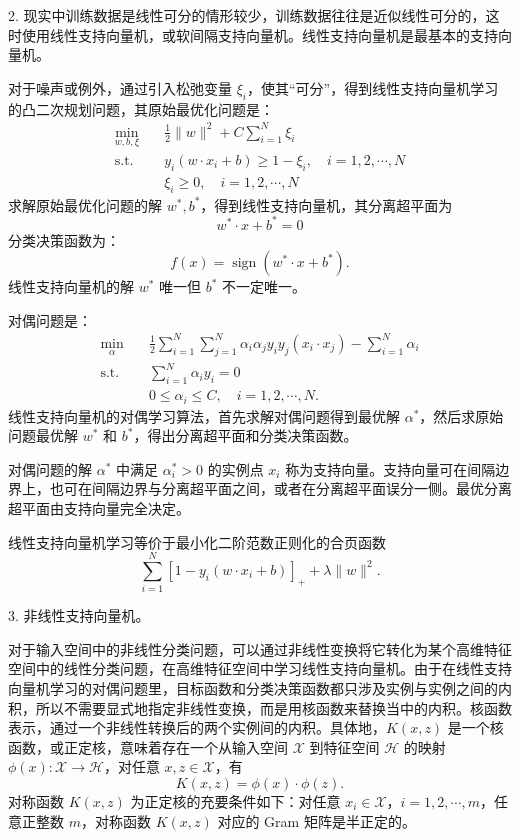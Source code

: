 \documentclass[UTF8, 12pt, fontset=fandol, oneside]{ctexart}
\begin{document}
2. 现实中训练数据是线性可分的情形较少，训练数据往往是近似线性可分的，这时使用线性支持向量机，或软间隔支持向量机。线性支持向量机是最基本的支持向量机。

对于噪声或例外，通过引入松弛变量 $\xi_i$，使其“可分”，得到线性支持向量机学习的凸二次规划问题，其原始最优化问题是：
\[
\begin{aligned}
\min_{w,b,\xi}\quad & \frac{1}{2}\|w\|^2+C\sum_{i=1}^N\xi_i\\
\mathrm{s.t.}\quad & y_i(w\cdot x_i+b)\geq 1-\xi_i,\quad i=1,2,\cdots,N\\
& \xi_i\geq 0,\quad i=1,2,\cdots,N
\end{aligned}
\]
求解原始最优化问题的解 $w^*,b^*$，得到线性支持向量机，其分离超平面为
\[
w^*\cdot x+b^*=0
\]
分类决策函数为：
\[
f(x)=\operatorname{sign}(w^*\cdot x+b^*).
\]
线性支持向量机的解 $w^*$ 唯一但 $b^*$ 不一定唯一。

对偶问题是：
\[
\begin{aligned}
\min_\alpha\quad & \frac{1}{2}\sum_{i=1}^N\sum_{j=1}^N\alpha_i\alpha_j y_i y_j(x_i\cdot x_j)-\sum_{i=1}^N\alpha_i\\
\mathrm{s.t.}\quad & \sum_{i=1}^N\alpha_i y_i=0\\
& 0\leq \alpha_i\leq C,\quad i=1,2,\cdots,N.
\end{aligned}
\]
线性支持向量机的对偶学习算法，首先求解对偶问题得到最优解 $\alpha^*$，然后求原始问题最优解 $w^*$ 和 $b^*$，得出分离超平面和分类决策函数。

对偶问题的解 $\alpha^*$ 中满足 $\alpha_i^*>0$ 的实例点 $x_i$ 称为支持向量。支持向量可在间隔边界上，也可在间隔边界与分离超平面之间，或者在分离超平面误分一侧。最优分离超平面由支持向量完全决定。

线性支持向量机学习等价于最小化二阶范数正则化的合页函数
\[
\sum_{i=1}^N[1-y_i(w\cdot x_i+b)]_++\lambda\|w\|^2.
\]

3. 非线性支持向量机。

对于输入空间中的非线性分类问题，可以通过非线性变换将它转化为某个高维特征空间中的线性分类问题，在高维特征空间中学习线性支持向量机。由于在线性支持向量机学习的对偶问题里，目标函数和分类决策函数都只涉及实例与实例之间的内积，所以不需要显式地指定非线性变换，而是用核函数来替换当中的内积。核函数表示，通过一个非线性转换后的两个实例间的内积。具体地，$K(x,z)$ 是一个核函数，或正定核，意味着存在一个从输入空间 $\mathcal{X}$ 到特征空间 $\mathcal{H}$ 的映射 $\phi(x):\mathcal{X}\to\mathcal{H}$，对任意 $x,z\in\mathcal{X}$，有
\[
K(x,z)=\phi(x)\cdot\phi(z).
\]
对称函数 $K(x,z)$ 为正定核的充要条件如下：对任意 $x_i\in\mathcal{X}$，$i=1,2,\cdots,m$，任意正整数 $m$，对称函数 $K(x,z)$ 对应的 Gram 矩阵是半正定的。
\end{document}

